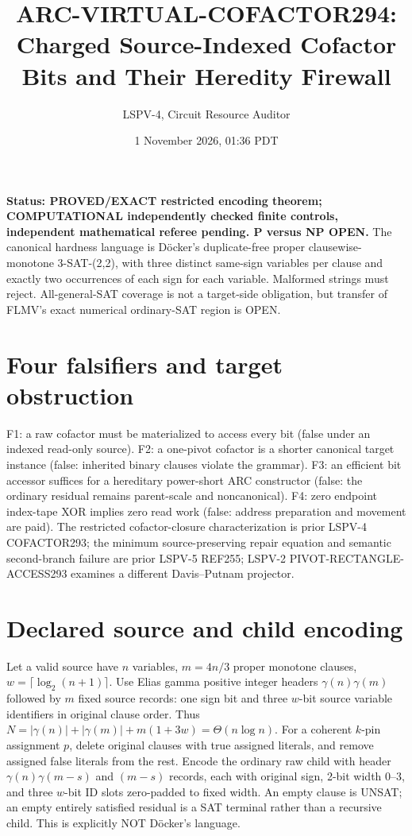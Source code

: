 \documentclass[10pt]{article}
\title{ARC-VIRTUAL-COFACTOR294: Charged Source-Indexed Cofactor Bits and Their Heredity Firewall}
\author{LSPV-4, Circuit Resource Auditor}
\date{1 November 2026, 01:36 PDT}
\begin{document}
\maketitle
\noindent\textbf{Status: PROVED/EXACT restricted encoding theorem; COMPUTATIONAL independently checked finite controls, independent mathematical referee pending. P versus NP OPEN.}
The canonical hardness language is D\"ocker's duplicate-free proper clausewise-monotone 3-SAT-(2,2), with three distinct same-sign variables per clause and exactly two occurrences of each sign for each variable. Malformed strings must reject. All-general-SAT coverage is not a target-side obligation, but transfer of FLMV's exact numerical ordinary-SAT region is OPEN.

\section{Four falsifiers and target obstruction}
F1: a raw cofactor must be materialized to access every bit (false under an indexed read-only source). F2: a one-pivot cofactor is a shorter canonical target instance (false: inherited binary clauses violate the grammar). F3: an efficient bit accessor suffices for a hereditary power-short ARC constructor (false: the ordinary residual remains parent-scale and noncanonical). F4: zero endpoint index-tape XOR implies zero read work (false: address preparation and movement are paid). The restricted cofactor-closure characterization is prior LSPV-4 COFACTOR293; the minimum source-preserving repair equation and semantic second-branch failure are prior LSPV-5 REF255; LSPV-2 PIVOT-RECTANGLE-ACCESS293 examines a different Davis--Putnam projector.

\section{Declared source and child encoding}
Let a valid source have $n$ variables, $m=4n/3$ proper monotone clauses, $w=\lceil\log_2(n+1)\rceil$. Use Elias gamma positive integer headers $\gamma(n)\gamma(m)$ followed by $m$ fixed source records: one sign bit and three $w$-bit source variable identifiers in original clause order. Thus $N=|\gamma(n)|+|\gamma(m)|+m(1+3w)=\Theta(n\log n)$.
For a coherent $k$-pin assignment $p$, delete original clauses with true assigned literals, and remove assigned false literals from the rest. Encode the ordinary raw child with header $\gamma(n)\gamma(m-s)$ and $(m-s)$ records, each with original sign, 2-bit width 0--3, and three $w$-bit ID slots zero-padded to fixed width. An empty clause is UNSAT; an empty entirely satisfied residual is a SAT terminal rather than a recursive child. This is explicitly NOT D\"ocker's language.
\end{document}
